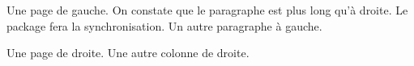 \begin{pages}
  \begin{Leftside}
    \beginnumbering
    \pstart
    Une page de gauche.
    On constate que le paragraphe est plus long qu'à droite.
    Le package fera la synchronisation.
    \pend
    \pstart
    Un autre paragraphe à gauche.
    \pend
    \endnumbering
  \end{Leftside}
  \begin{Rightside}
    \beginnumbering
    \pstart
    Une page de droite.
    \pend
    \pstart
    Une autre colonne de droite.
    \pend
    \endnumbering
  \end{Rightside}
\end{pages}
\Pages
